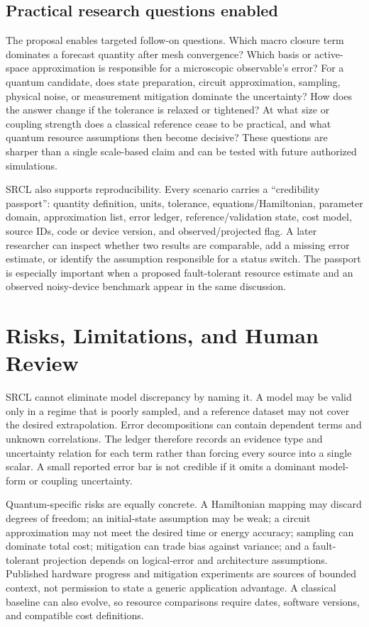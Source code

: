 \documentclass[conference]{../../../../Conference-LaTeX-template_10-17-19/IEEEtran}
\begin{document}
\subsection{Practical research questions enabled}
The proposal enables targeted follow-on questions. Which macro closure term dominates a forecast quantity after mesh convergence? Which basis or active-space approximation is responsible for a microscopic observable’s error? For a quantum candidate, does state preparation, circuit approximation, sampling, physical noise, or measurement mitigation dominate the uncertainty? How does the answer change if the tolerance is relaxed or tightened? At what size or coupling strength does a classical reference cease to be practical, and what quantum resource assumptions then become decisive? These questions are sharper than a single scale-based claim and can be tested with future authorized simulations.

SRCL also supports reproducibility. Every scenario carries a ``credibility passport'': quantity definition, units, tolerance, equations/Hamiltonian, parameter domain, approximation list, error ledger, reference/validation state, cost model, source IDs, code or device version, and observed/projected flag. A later researcher can inspect whether two results are comparable, add a missing error estimate, or identify the assumption responsible for a status switch. The passport is especially important when a proposed fault-tolerant resource estimate and an observed noisy-device benchmark appear in the same discussion.

\section{Risks, Limitations, and Human Review}
SRCL cannot eliminate model discrepancy by naming it. A model may be valid only in a regime that is poorly sampled, and a reference dataset may not cover the desired extrapolation. Error decompositions can contain dependent terms and unknown correlations. The ledger therefore records an evidence type and uncertainty relation for each term rather than forcing every source into a single scalar. A small reported error bar is not credible if it omits a dominant model-form or coupling uncertainty.

Quantum-specific risks are equally concrete. A Hamiltonian mapping may discard degrees of freedom; an initial-state assumption may be weak; a circuit approximation may not meet the desired time or energy accuracy; sampling can dominate total cost; mitigation can trade bias against variance; and a fault-tolerant projection depends on logical-error and architecture assumptions. Published hardware progress and mitigation experiments are sources of bounded context, not permission to state a generic application advantage. A classical baseline can also evolve, so resource comparisons require dates, software versions, and compatible cost definitions.
\end{document}
